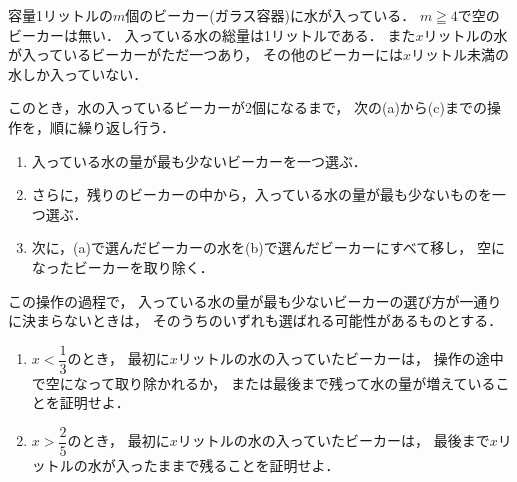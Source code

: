 \documentclass[../../main.tex]{subfiles}
\begin{document}
容量1リットルの$m$個のビーカー(ガラス容器)に水が入っている．
$m \geqq 4$で空のビーカーは無い．
入っている水の総量は1リットルである．
また$x$リットルの水が入っているビーカーがただ一つあり，
その他のビーカーには$x$リットル未満の水しか入っていない．

このとき，水の入っているビーカーが2個になるまで，
次の(a)から(c)までの操作を，順に繰り返し行う．
\begin{enumerate}
  \item[(a)] 入っている水の量が最も少ないビーカーを一つ選ぶ．
  \item[(b)] さらに，残りのビーカーの中から，入っている水の量が最も少ないものを一つ選ぶ．
  \item[(c)] 次に，(a)で選んだビーカーの水を(b)で選んだビーカーにすべて移し，
    空になったビーカーを取り除く．
\end{enumerate}
この操作の過程で，
入っている水の量が最も少ないビーカーの選び方が一通りに決まらないときは，
そのうちのいずれも選ばれる可能性があるものとする．
\begin{enumerate}
  \item $\displaystyle x<\dfrac{1}{3}$のとき，
    最初に$x$リットルの水の入っていたビーカーは，
    操作の途中で空になって取り除かれるか，
    または最後まで残って水の量が増えていることを証明せよ．
  \item $\displaystyle x>\dfrac{2}{5}$のとき，
    最初に$x$リットルの水の入っていたビーカーは，
    最後まで$x$リットルの水が入ったままで残ることを証明せよ．
\end{enumerate}
\end{document}
